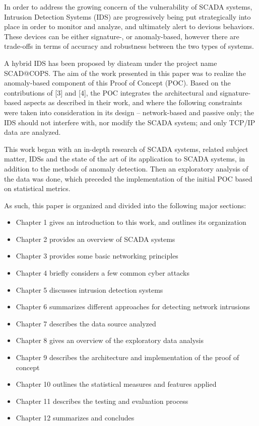\documentclass[11pt,]{article}
\begin{document}
In order to address the growing concern of the vulnerability of SCADA
systems, Intrusion Detection Systems (IDS) are progressively being put
strategically into place in order to monitor and analyze, and ultimately
alert to devious behaviors. These devices can be either signature-, or
anomaly-based, however there are trade-offs in terms of accuracy and
robustness between the two types of systems.

A hybrid IDS has been proposed by diateam under the project name
SCAD@COPS. The aim of the work presented in this paper was to realize
the anomaly-based component of this Proof of Concept (POC). Based on the
contributions of {[}3{]} and {[}4{]}, the POC integrates the
architectural and signature-based aspects as described in their work,
and where the following constraints were taken into consideration in its
design -- network-based and passive only; the IDS should not interfere
with, nor modify the SCADA system; and only TCP/IP data are analyzed.

This work began with an in-depth research of SCADA systems, related
subject matter, IDSs and the state of the art of its application to
SCADA systems, in addition to the methods of anomaly detection. Then an
exploratory analysis of the data was done, which preceded the
implementation of the initial POC based on statistical metrics.

As such, this paper is organized and divided into the following major
sections:

\begin{itemize}
\itemsep1pt\parskip0pt
\item
  Chapter 1 gives an introduction to this work, and outlines its
  organization
\item
  Chapter 2 provides an overview of SCADA systems
\item
  Chapter 3 provides some basic networking principles
\item
  Chapter 4 briefly considers a few common cyber attacks
\item
  Chapter 5 discusses intrusion detection systems
\item
  Chapter 6 summarizes different approaches for detecting network
  intrusions
\item
  Chapter 7 describes the data source analyzed
\item
  Chapter 8 gives an overview of the exploratory data analysis
\item
  Chapter 9 describes the architecture and implementation of the proof
  of concept
\item
  Chapter 10 outlines the statistical measures and features applied
\item
  Chapter 11 describes the testing and evaluation process
\item
  Chapter 12 summarizes and concludes
\end{itemize}
\end{document}
